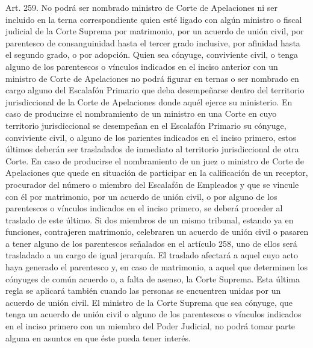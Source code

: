     Art. 259. No podrá ser nombrado ministro de Corte de Apelaciones ni ser incluido en la terna correspondiente quien esté ligado con algún ministro o fiscal judicial de la Corte Suprema por matrimonio, por un acuerdo de unión civil, por parentesco de consanguinidad hasta el tercer grado inclusive, por afinidad hasta el segundo grado, o por adopción.
    Quien sea cónyuge, conviviente civil, o tenga alguno de los parentescos o vínculos indicados en el inciso anterior con un ministro de Corte de Apelaciones no podrá figurar en ternas o ser nombrado en cargo alguno del Escalafón Primario que deba desempeñarse dentro del territorio jurisdiccional de la Corte de Apelaciones donde aquél ejerce su ministerio.
    En caso de producirse el nombramiento de un ministro en una Corte en cuyo territorio jurisdiccional se desempeñan en el Escalafón Primario su cónyuge, conviviente civil, o alguno de los parientes indicados en el inciso primero, estos últimos deberán ser trasladados de inmediato al territorio jurisdiccional de otra Corte.
    En caso de producirse el nombramiento de un juez o ministro de Corte de Apelaciones que quede en situación de participar en la calificación de un receptor, procurador del número o miembro del Escalafón de Empleados y que se vincule con él por matrimonio, por un acuerdo de unión civil, o por alguno de los parentescos o vínculos indicados en el inciso primero, se deberá proceder al traslado de este último.
    Si dos miembros de un mismo tribunal, estando ya en funciones, contrajeren matrimonio, celebraren un acuerdo de unión civil o pasaren a tener alguno de los parentescos señalados en el artículo 258, uno de ellos será trasladado a un cargo de igual jerarquía. El traslado afectará a aquel cuyo acto haya generado el parentesco y, en caso de matrimonio, a aquel que determinen los cónyuges de común acuerdo o, a falta de asenso, la Corte Suprema. Esta última regla se aplicará también cuando las personas se encuentren unidas por un acuerdo de unión civil.
    El ministro de la Corte Suprema que sea cónyuge, que tenga un acuerdo de unión civil o alguno de los parentescos o vínculos indicados en el inciso primero con un miembro del Poder Judicial, no podrá tomar parte alguna en asuntos en que éste pueda tener interés.



